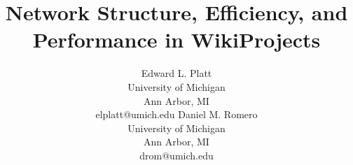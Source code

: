 \documentclass[letterpaper]{article} %
\begin{document}
%
\title{Network Structure, Efficiency, and Performance in WikiProjects}
\author{Edward L. Platt \\
University of Michigan\\
Ann Arbor, MI\\
elplatt@umich.edu
\And
Daniel M. Romero\\
University of Michigan\\
Ann Arbor, MI\\
drom@umich.edu
}
\maketitle





\end{document}
